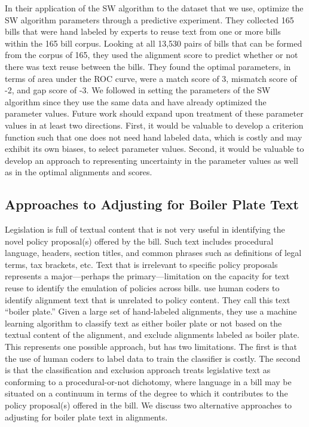 \documentclass[12pt]{article} %
\begin{document}
In their application of the SW algorithm to the dataset that we use, \citet{burgess2016legislative} optimize the SW algorithm parameters through a predictive experiment. They collected 165 bills that were hand labeled by experts to reuse text from one or more bills within the 165 bill corpus. Looking at all 13,530 pairs of bills that can be formed from the corpus of 165, they used the alignment score to predict whether or not there was text reuse between the bills. They found the optimal parameters, in terms of area under the ROC curve, were a match score of 3, mismatch score of -2, and gap score of -3. We followed \citet{burgess2016legislative} in setting the parameters of the SW algorithm since they use the same data and have already optimized the parameter values. Future work should expand upon treatment of these parameter values in at least two directions. First, it would be valuable to develop a criterion function such that one does not need hand labeled data, which is costly and may exhibit its own biases, to select parameter values. Second, it would be valuable to develop an approach to representing uncertainty in the parameter values as well as in the optimal alignments and scores.

\subsection{Approaches to Adjusting for Boiler Plate Text}

Legislation is full of textual content that is not very useful in identifying the novel policy proposal(s) offered by the bill. Such text includes procedural language, headers, section titles, and common phrases such as definitions of legal terms, tax brackets, etc. Text that is irrelevant to specific policy proposals represents a major---perhaps the primary---limitation on the capacity for text reuse to identify the emulation of policies across bills. \citet{wilkerson2015tracing} use human coders to identify alignment text that is unrelated to policy content. They call this text ``boiler plate.'' Given a large set of hand-labeled alignments, they use a machine learning algorithm to classify text as either boiler plate or not based on the textual content of the alignment, and exclude alignments labeled as boiler plate. This represents one possible approach, but has two limitations. The first is that the use of human coders to label data to train the classifier is costly. The second is that the classification and exclusion approach treats legislative text as conforming to a procedural-or-not dichotomy, where language in a bill may be situated on a continuum in terms of the degree to which it contributes to the policy proposal(s) offered in the bill. We discuss two alternative approaches to adjusting for boiler plate text in alignments.
\end{document}
